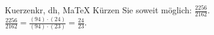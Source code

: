 \begin{MAufgabe}{Kuerzen}{kr, dh, MaTeX}
K\"urzen Sie soweit m\"oglich: $\frac{2256}{2162}$.\\ 
\ifLsg\MLoesung
\quad $\frac{2256}{2162}=\frac{(94)\cdot(24)}{(94)\cdot(23)}=\frac{24}{23}$.\else\relax\fi
 \end{MAufgabe}